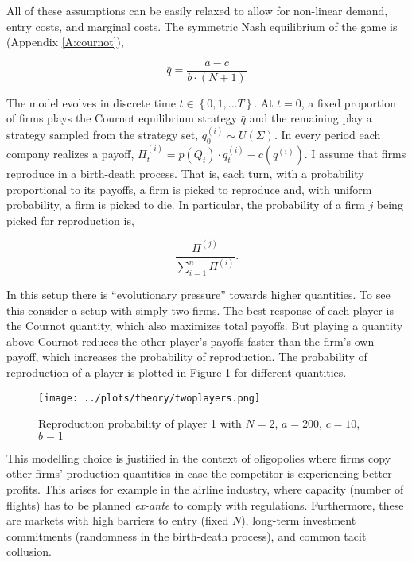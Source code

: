 \documentclass[american]{scrartcl}
\newcommand{\set}[1]{\left\{#1\right\}}
\begin{document}
All of these assumptions can be easily relaxed to allow for non-linear demand, entry costs, and marginal costs. The symmetric Nash equilibrium of the game is (Appendix \ref{A:cournot}),

\begin{equation} \label{equilib}
    \bar{q}= \frac{a - c}{b \cdot (N+1)}
\end{equation}

The model evolves in discrete time $t \in \set{0, 1, \ldots T}$. At $t = 0$, a fixed proportion of firms plays the Cournot equilibrium strategy $\bar{q}$ and the remaining play a strategy sampled from the strategy set, $q^{(i)}_0 \sim U(\Sigma)$. In every period each company realizes a payoff, $\Pi^{(i)}_t = p(Q_t) \cdot q^{(i)}_t - c(q^{(i)})$. I assume that firms reproduce in a birth-death process. That is, each turn, with a probability proportional to its payoffs, a firm is picked to reproduce and, with uniform probability, a firm is picked to die. In particular, the probability of a firm $j$ being picked for reproduction is,

\begin{equation}
    \frac{\Pi^{(j)}}{\sum^n_{i = 1} \Pi^{(i)}}.
\end{equation}

In this setup there is ``evolutionary pressure'' towards higher quantities. To see this consider a setup with simply two firms. The best response of each player is the Cournot quantity, which also maximizes total payoffs. But playing a quantity above Cournot reduces the other player's payoffs faster than the firm's own payoff, which increases the probability of reproduction. The probability of reproduction of a player is plotted in Figure \ref{fig:relprob} for different quantities.

\begin{center}
    \begin{figure}[H]
        \center
        \texttt{[image: ../plots/theory/twoplayers.png]}
        \caption{Reproduction probability of player 1 with $N = 2$, $a = 200$, $c = 10$, $b = 1$}
        \label{fig:relprob}
    \end{figure}
\end{center}

This modelling choice is justified in the context of oligopolies where firms copy other firms' production quantities in case the competitor is experiencing better profits. This arises for example in the airline industry, where capacity (number of flights) has to be planned \textit{ex-ante} to comply with regulations. Furthermore, these are markets with high barriers to entry (fixed $N$), long-term investment commitments (randomness in the birth-death process), and common tacit collusion.
\end{document}
